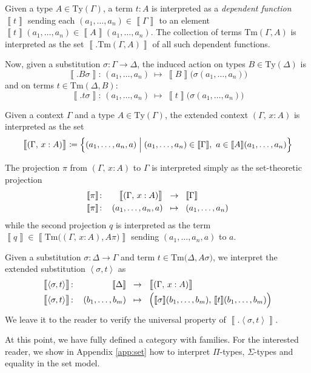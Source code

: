 \documentclass{article}
\theoremstyle{definition}
\renewcommand{\int}[1]{\mathopen{}\left\llbracket #1
    \right\rrbracket\mathclose{}}       %
\newcommand{\substType}[2]{#2#1}%
\newcommand{\substTerm}[2]{#2#1}%
\newcommand{\extsub}[2]{\ang{#1,#2}}
\newcommand{\Ty}{\mathrm{Ty}}
\newcommand{\Tm}{\mathrm{Tm}}
\newcommand{\defeq}{
	\mathrel{\mathrel{\mathop:}\mkern-1.2mu=}}	%
\newcommand{\ang}[1]{\mathopen{}\left\langle #1 \right\rangle\mathclose{}}
\newcommand{\n}{%
}                %
\begin{document}
Given a type $A \in \Ty(\Gamma)$, a term $t : A$ is interpreted as a \textit{dependent function} $\int{t}$ sending each $(a_1,\ldots,a_n) \in \int{\Gamma}$ to an element $\int{t}\n(a_1,\ldots,a_n) \in \int{A}\n(a_1,\ldots,a_n)$. The collection of terms $\Tm(\Gamma,A)$ is interpreted as the set $\int{\big.\Tm(\Gamma,A)}$ of all such dependent functions.

Now, given a substitution $\sigma\colon \Gamma \to \Delta$, the induced action on types $B \in \Ty(\Delta)$ is $$\int{\big.\substType{\sigma}{B}}\colon\, (a_1,\ldots,a_n)\ \mapsto\ \int{B}\n\big( \sigma(a_1,\ldots,a_n) \big)$$
and on terms $t \in \Tm(\Delta,B)$:
$$\int{\big.\substTerm{\sigma}{t}} :\, (a_1,\ldots,a_n)\ \mapsto\ \int{t}\n\big( \sigma(a_1,\ldots,a_n) \big)$$

Given a context $\Gamma$ and a type $A \in \Ty(\Gamma)$, the extended context $(\Gamma,\, x : A)$ is interpreted as the set
$$\int{\big.(\Gamma,\, x : A)} \defeq \Big\{ (a_1,\ldots,a_n,a) \mathrel{\Big|} (a_1,\ldots,a_n) \in \int{\Gamma},\ a \in \int{A}\n(a_1,\ldots,a_n) \Big\}$$

The projection $\pi$ from $(\Gamma,\, x : A)$ to $\Gamma$ is interpreted simply as the set-theoretic projection
$$\arraycolsep=1.5mm
\begin{array}{rrcl}
    \int{\pi}\colon& \int{\big.(\Gamma,\, x : A)} &\to& \int{\Gamma}\\[1mm]
    \int{\pi}\colon& (a_1,\ldots,a_n,a) &\mapsto& (a_1,\ldots,a_n)
\end{array}$$
while the second projection $q$ is interpreted as the term $\int{q} \in \int{\Tm \big( (\Gamma,\, x : A), \substType{\pi}{A} \big)}$ sending $(a_1,\ldots,a_n,a)$ to $a$.

Given a substitution $\sigma\colon \Delta \to \Gamma$ and term $t \in \Tm \big( \Delta, \substType{\sigma}{A} \big)$, we interpret the extended substitution $\extsub{\sigma}{t}$ as
$$\arraycolsep=1.5mm
\begin{array}{rrcl}
    \int{\big.\extsub{\sigma}{t}}\colon& \int{\Delta} &\to& \int{\big.(\Gamma,\, x : A)} \\[1mm]
    \int{\big.\extsub{\sigma}{t}}\colon& (b_1,\ldots,b_m) &\mapsto& \Big( \int{\sigma}\n(b_1,\ldots,b_m),\, \int{t}\n(b_1,\ldots,b_m) \Big)
\end{array}$$
We leave it to the reader to verify the universal property of $\int{\big.\extsub{\sigma}{t}}$.

At this point, we have fully defined a category with families. For the interested reader, we show in Appendix \ref{app:set} how to interpret $\Pi$-types, $\Sigma$-types and equality in the set model.
\end{document}
